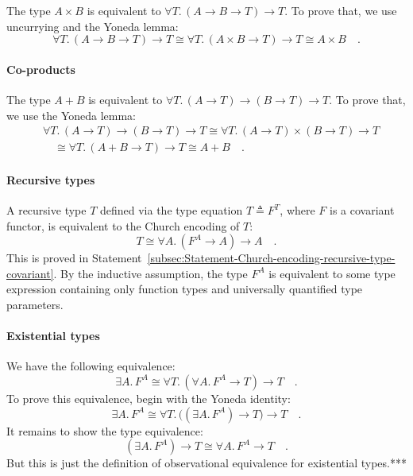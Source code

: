 The type $A\times B$ is equivalent to $\forall T.\,(A\rightarrow B\rightarrow T)\rightarrow T$.
To prove that, we use uncurrying and the Yoneda lemma:
\[
\forall T.\,(A\rightarrow B\rightarrow T)\rightarrow T\cong\forall T.\,(A\times B\rightarrow T)\rightarrow T\cong A\times B\quad.
\]


\paragraph{Co-products}

The type $A+B$ is equivalent to $\forall T.\,(A\rightarrow T)\rightarrow(B\rightarrow T)\rightarrow T$.
To prove that, we use the Yoneda lemma:
\begin{align*}
 & \forall T.\,(A\rightarrow T)\rightarrow(B\rightarrow T)\rightarrow T\cong\forall T.\,(A\rightarrow T)\times(B\rightarrow T)\rightarrow T\\
 & \quad\cong\forall T.\,(A+B\rightarrow T)\rightarrow T\cong A+B\quad.
\end{align*}


\paragraph{Recursive types}

A recursive type $T$ defined via the type equation $T\triangleq F^{T}$,
where $F$ is a covariant functor, is equivalent to the Church encoding
of $T$:
\[
T\cong\forall A.\,(F^{A}\rightarrow A)\rightarrow A\quad.
\]
This is proved in Statement~\ref{subsec:Statement-Church-encoding-recursive-type-covariant}.
By the inductive assumption, the type $F^{A}$ is equivalent to some
type expression containing only function types and universally quantified
type parameters.

\paragraph{Existential types}

We have the following equivalence:
\[
\exists A.\,F^{A}\cong\forall T.\,(\forall A.\,F^{A}\rightarrow T)\rightarrow T\quad.
\]
To prove this equivalence, begin with the Yoneda identity:
\[
\exists A.\,F^{A}\cong\forall T.\,\big((\exists A.\,F^{A})\rightarrow T\big)\rightarrow T\quad.
\]
It remains to show the type equivalence: 
\[
(\exists A.\,F^{A})\rightarrow T\cong\forall A.\,F^{A}\rightarrow T\quad.
\]
But this is just the definition of observational equivalence for existential
types.{*}{*}{*}

